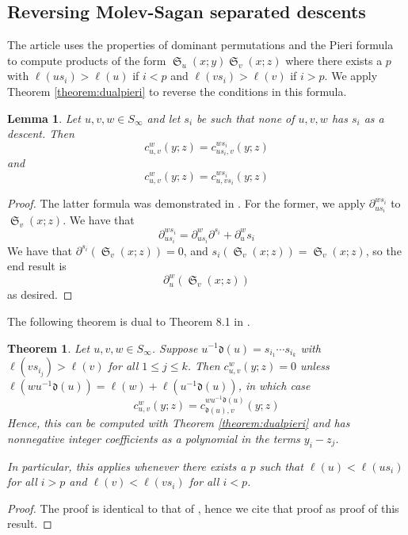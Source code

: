 \documentclass{amsart}
\newtheorem{lemma}{Lemma}[subsection]
\newtheorem{theorem}{Theorem}[section]
\theoremstyle{definition}
\theoremstyle{remark}
\numberwithin{equation}{subsection}
\DeclareMathOperator{\sch}{\mathfrak{S}}
\newcommand{\dom}{\mathfrak{d}}
\begin{document}
\subsection{Reversing Molev-Sagan separated descents}
%
The article \cite{samuelmolev} uses the properties of dominant permutations and the Pieri formula to compute products of the form $\sch_u(x;y)\sch_v(x;z)$ where there exists a $p$ with $\ell(us_i)>\ell(u)$ if $i<p$ and $\ell(vs_i)>\ell(v)$ if $i>p$. We apply Theorem \ref{theorem:dualpieri} to reverse the conditions in this formula.
%
\begin{lemma} \label{lemma:shiftup}
Let $u,v,w\in S_\infty$ and let $s_i$ be such that none of $u,v,w$ has $s_i$ as a descent. Then
$$c_{u,v}^w(y;z)=c_{us_i,v}^{ws_i}(y;z)$$
and
$$c_{u,v}^w(y;z)=c_{u,vs_i}^{ws_i}(y;z)$$
\end{lemma}
\begin{proof}
The latter formula was demonstrated in \cite{samuelmolev}. For the former, we apply $\partial_{us_i}^{ws_i}$ to $\sch_v(x;z)$. We have that
$$\partial_{us_i}^{ws_i}=\partial_{us_i}^{w}\partial^{s_i}+\partial_{u}^ws_i$$
We have that $\partial^{s_i}(\sch_v(x;z))=0$, and $s_i(\sch_v(x;z))=\sch_v(x;z)$, so the end result is
$$\partial_u^w(\sch_v(x;z))$$
as desired.
\end{proof}
%
The following theorem is dual to Theorem 8.1 in \cite{samuelmolev}.
\begin{theorem} \label{theorem:appl}
Let $u,v,w\in S_\infty$. Suppose $u^{-1}\dom(u)=s_{i_1}\cdots s_{i_k}$ with $\ell(vs_{i_j})>\ell(v)$ for all $1\leq j\leq k$. Then $c_{u,v}^w(y;z)=0$ unless $\ell(wu^{-1}\dom(u))=\ell(w)+\ell(u^{-1}\dom(u))$, in which case
$$c_{u,v}^w(y;z)=c_{\dom(u),v}^{wu^{-1}\dom(u)}(y;z)$$
Hence, this can be computed with Theorem \ref{theorem:dualpieri} and has nonnegative integer coefficients as a polynomial in the terms $y_i-z_j$. 

In particular, this applies whenever there exists a $p$ such that $\ell(u)<\ell(us_i)$ for all $i>p$ and $\ell(v)<\ell(vs_i)$ for all $i<p$.
\end{theorem}
\begin{proof}
The proof is identical to that of \cite[Proposition~4.3]{samuelmolev}, hence we cite that proof as proof of this result.
\end{proof}
\end{document}
